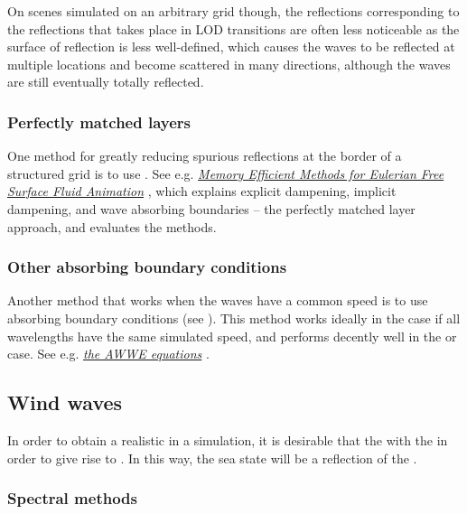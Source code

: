 On scenes simulated on an arbitrary grid though, the reflections corresponding to the reflections that takes place in LOD transitions are often less noticeable as the surface of reflection is less well-defined, which causes the waves to be reflected at multiple locations and become scattered in many directions, although the waves are still eventually totally reflected.

\subsubsection{Perfectly matched layers}

One method for greatly reducing spurious reflections at the border of a structured grid is to use . See e.g. \textit{\href{http://liu.diva-portal.org/smash/get/diva2:359805/FULLTEXT01}{Memory Efficient Methods for Eulerian Free Surface Fluid Animation}} \citep{temp}, which explains explicit dampening, implicit dampening, and wave absorbing boundaries -- the perfectly matched layer approach, and evaluates the methods.

\subsubsection{Other absorbing boundary conditions}

Another method that works when the waves have a common speed is to use absorbing boundary conditions (see \citep{temp}). This method works ideally in the  case if all wavelengths have the same simulated speed, and performs decently well in the  or  case. See e.g. \textit{\href{http://www.ce.ncsu.edu/centers/cmg/AWWE/}{the AWWE equations}} \citep{temp}.
\subsection{Wind waves}

In order to obtain a realistic  in a simulation, it is desirable that the  \interacts with the \wind in order to give rise to . In this way, the sea state will be a reflection of the .

\subsubsection{Spectral methods}

